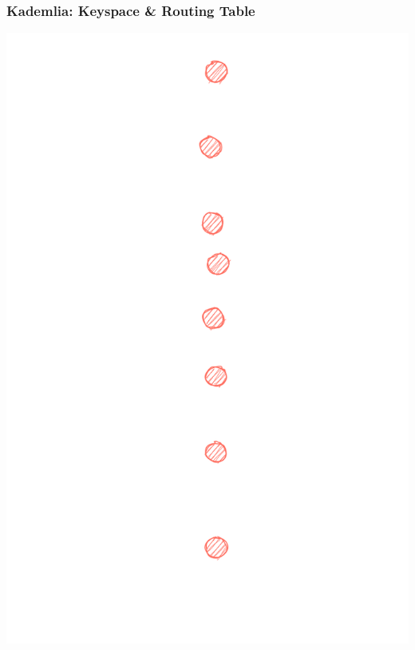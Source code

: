 \documentclass{../shipyard-slide}
\begin{document}
\begin{frame}
\frametitle{Kademlia: Keyspace \& Routing Table}

\hspace{4cm}\includegraphics[scale=.13]{resources/rt0-1.png}
\end{frame}
\end{document}
